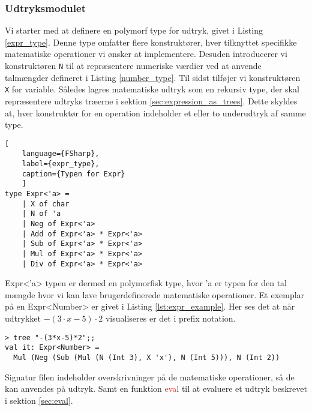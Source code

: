 \subsubsection{Udtryksmodulet}\label{sec:expression_module}
Vi starter med at definere en polymorf type for udtryk, givet i Listing \ref{expr_type}. Denne type omfatter flere konstruktører, hver tilknyttet specifikke matematiske operationer vi ønsker at implementere. Desuden introducerer vi konstruktøren \texttt{N} til at repræsentere numeriske værdier ved at anvende talmængder defineret i Listing \ref{number_type}. Til sidst tilføjer vi konstruktøren \texttt{X} for variable. Således lagres matematiske udtryk som en rekursiv type, der skal repræsentere udtryks træerne i sektion \ref{sec:expression_as_trees}. Dette skyldes at, hver konstruktør for en operation indeholder et eller to underudtryk af samme type.


\begin{lstlisting}[
    language={FSharp}, 
    label={expr_type}, 
    caption={Typen for Expr}
    ]
type Expr<'a> = 
    | X of char
    | N of 'a
    | Neg of Expr<'a>
    | Add of Expr<'a> * Expr<'a>
    | Sub of Expr<'a> * Expr<'a>
    | Mul of Expr<'a> * Expr<'a>
    | Div of Expr<'a> * Expr<'a>
\end{lstlisting}

Expr\textless'a\textgreater{}  typen er dermed en polymorfisk type, hvor 'a er typen for den tal mængde hvor vi kan lave brugerdefinerede matematiske operationer. Et exemplar på en Expr\textless Number\textgreater{}  er givet i Listing \ref{lst:expr_example}. Her ses det at når udtrykket $-(3 \cdot x - 5) \cdot 2$ visualiseres er det i prefix notation. 

\begin{lstlisting}[style=output, label={lst:expr_example}, caption={$-(3 \cdot x - 5) \cdot 2$ som et udtryks træ. Funktionen \textcolor{red}{tree} bliver beskrevet i \ref{sec:expression_generation}.}]
> tree "-(3*x-5)*2";;
val it: Expr<Number> = 
  Mul (Neg (Sub (Mul (N (Int 3), X 'x'), N (Int 5))), N (Int 2))
\end{lstlisting}

Signatur filen indeholder overskrivninger på de matematiske operationer, så de kan anvendes på udtryk. Samt en funktion \textcolor{red}{eval} til at evaluere et udtryk beskrevet i sektion \ref{sec:eval}. 




